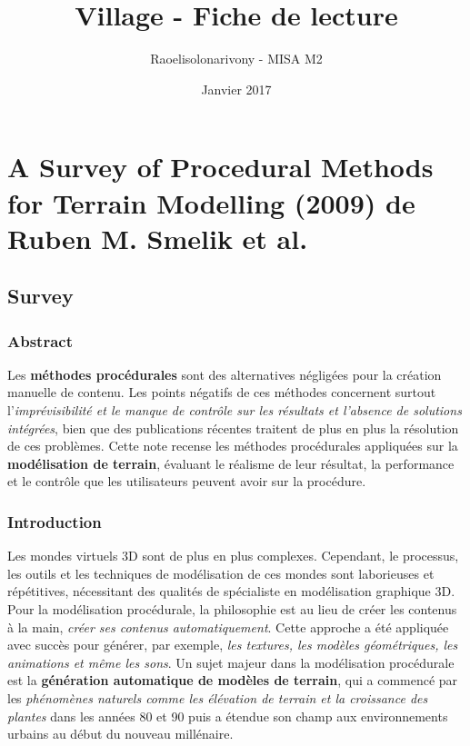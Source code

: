 \documentclass[11pt]{report}
\title{Village - Fiche de lecture}
\author{Raoelisolonarivony - MISA M2}
\date{Janvier 2017}
\begin{document}
\maketitle

\part{A Survey of Procedural Methods for Terrain Modelling (2009) de Ruben M. Smelik et al.}

\chapter{Survey}
\section{Abstract}

Les \textbf{méthodes procédurales} sont des alternatives négligées pour la création manuelle de contenu. Les points négatifs de ces méthodes concernent surtout l'\textit{imprévisibilité et le manque de contrôle sur les résultats et l'absence de solutions intégrées}, bien que des publications récentes traitent de plus en plus la résolution de ces problèmes. Cette note recense les méthodes procédurales appliquées sur la \textbf{modélisation de terrain}, évaluant le réalisme de leur résultat, la performance et le contrôle que les utilisateurs peuvent avoir sur la procédure.

\section{Introduction}

Les mondes virtuels 3D sont de plus en plus complexes. Cependant, le processus, les outils et les techniques de modélisation de ces mondes sont laborieuses et répétitives, nécessitant des qualités de spécialiste en modélisation graphique 3D.
Pour la modélisation procédurale, la philosophie est au lieu de créer les contenus à la main, \textit{créer ses contenus automatiquement}. Cette approche a été appliquée avec succès pour générer, par exemple, \textit{les textures, les modèles géométriques, les animations et même les sons}. Un sujet majeur dans la modélisation procédurale est la \textbf{génération automatique de modèles de terrain}, qui a commencé par les \textit{phénomènes naturels comme les élévation de terrain et la croissance des plantes} dans les années 80 et 90 puis a étendue son champ aux environnements urbains au début du nouveau millénaire. \newline
\end{document}
